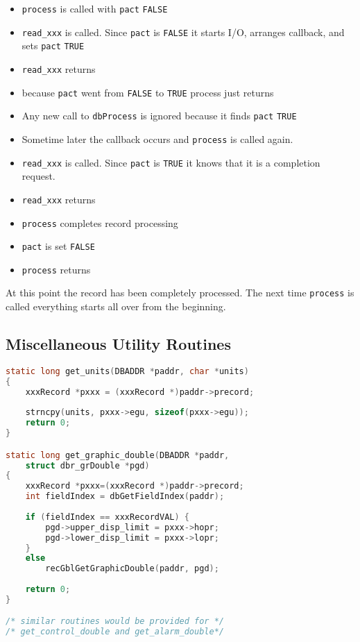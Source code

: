 \begin{itemize}
\item \verb|process| is called with \verb|pact| \verb|FALSE|

\item \verb|read_xxx| is called.
Since \verb|pact| is \verb|FALSE| it starts I/O, arranges callback, and sets \verb|pact| \verb|TRUE|

\item \verb|read_xxx| returns

\item because \verb|pact| went from \verb|FALSE| to \verb|TRUE| process just returns

\item Any new call to \verb|dbProcess| is ignored because it finds \verb|pact| \verb|TRUE|

\item Sometime later the callback occurs and \verb|process| is called again.

\item \verb|read_xxx| is called.
Since \verb|pact| is \verb|TRUE| it knows that it is a completion request.

\item \verb|read_xxx| returns

\item \verb|process| completes record processing

\item \verb|pact| is set \verb|FALSE|

\item \verb|process| returns

\end{itemize}

At this point the record has been completely processed.
The next time \verb|process| is called everything starts all over from the beginning.

\subsection{Miscellaneous Utility Routines}

\begin{lstlisting}[language=C]
static long get_units(DBADDR *paddr, char *units)
{
    xxxRecord *pxxx = (xxxRecord *)paddr->precord;
    
    strncpy(units, pxxx->egu, sizeof(pxxx->egu));
    return 0;
}

static long get_graphic_double(DBADDR *paddr,
    struct dbr_grDouble *pgd)
{
    xxxRecord *pxxx=(xxxRecord *)paddr->precord;
    int fieldIndex = dbGetFieldIndex(paddr);
    
    if (fieldIndex == xxxRecordVAL) {
        pgd->upper_disp_limit = pxxx->hopr;
        pgd->lower_disp_limit = pxxx->lopr;
    }
    else
        recGblGetGraphicDouble(paddr, pgd);
    
    return 0;
}

/* similar routines would be provided for */
/* get_control_double and get_alarm_double*/
\end{lstlisting}

